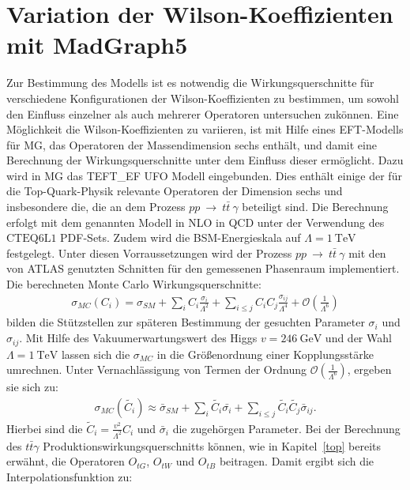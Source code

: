 \section{Variation der Wilson-Koeffizienten mit MadGraph5}
Zur Bestimmung des Modells ist es notwendig die Wirkungsquerschnitte für verschiedene Konfigurationen der Wilson-Koeffizienten zu bestimmen, um sowohl den Einfluss einzelner als auch mehrerer Operatoren untersuchen zukönnen. Eine Möglichkeit die Wilson-Koeffizienten zu variieren, ist mit Hilfe eines  EFT-Modells für MG, das Operatoren der Massendimension sechs enthält, und damit eine Berechnung der Wirkungsquerschnitte unter dem Einfluss dieser ermöglicht. Dazu wird in MG das TEFT\_EF UFO Modell\cite{EFTModell} eingebunden. Dies enthält einige der für die Top-Quark-Physik relevante Operatoren der Dimension sechs und insbesondere die, die an dem Prozess $pp~\rightarrow~t\bar{t}~\gamma$ beteiligt sind.
Die Berechnung erfolgt mit dem genannten Modell in NLO in QCD unter der Verwendung des $\text{CTEQ}6\text{L}1$ PDF-Sets. Zudem wird die BSM-Energieskala auf $\Lambda = \SI{1}{\tera\electronvolt}$ festgelegt. Unter diesen Vorraussetzungen wird der Prozess $pp~\rightarrow~t\bar{t}~\gamma$ mit den von ATLAS genutzten Schnitten für den gemessenen Phasenraum implementiert.\\
Die berechneten Monte Carlo Wirkungsquerschnitte:
\begin{align}
  \sigma_{MC}({C_i}) = \sigma_{SM} + \sum_{i} C_i \frac{\sigma_i}{\Lambda^2} + \sum_{i \leq j} C_i C_j \frac{\sigma_{ij}}{\Lambda^4} + \mathcal{O}\left(\frac{1}{\Lambda^6}\right)
\end{align}
bilden die Stützstellen zur späteren Bestimmung der gesuchten Parameter $\sigma_i$ und $\sigma_{ij}$. Mit Hilfe des Vakuumerwartungswert des Higgs $v = \SI{246}{\giga\electronvolt}$ und der Wahl $\Lambda = \SI{1}{\tera\electronvolt}$ lassen sich die $\sigma_{MC}$ in die Größenordnung einer Kopplungsstärke umrechnen. Unter Vernachlässigung von Termen der Ordnung $\mathcal{O}(\frac{1}{\Lambda^6})$, ergeben sie sich zu:
\begin{align}
  \sigma_{MC}({\tilde{C_i}}) \approx \bar{\sigma}_{SM} + \sum_{i} \tilde{C_i} \bar{\sigma_i} + \sum_{i \leq j} \tilde{C_i} \tilde{C_j} \bar{\sigma}_{ij}.
\end{align}
Hierbei sind die $\tilde{C}_i = \frac{v^2}{\Lambda^2} C_i$ und $\bar{\sigma}_i$ die zugehörgen Parameter.
Bei der Berechnung des $t\bar{t}\gamma$ Produktionswirkungsquerschnitts können, wie in Kapitel~\ref{top} bereits erwähnt, die Operatoren $O_{tG}$, $O_{tW}$ und $O_{tB}$ beitragen. Damit ergibt sich die Interpolationsfunktion zu:
